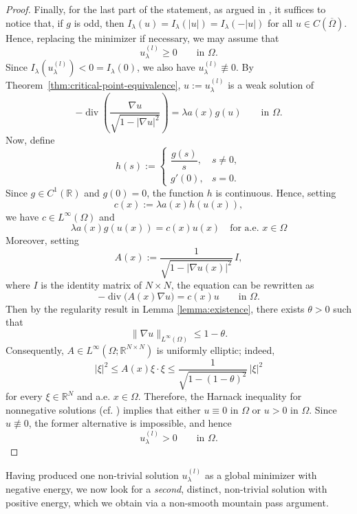 \documentclass[11pt,reqno]{amsart}
\theoremstyle{plain}
\theoremstyle{definition}
\numberwithin{equation}{section}
\begin{document}
\begin{proof}
Finally, for the last part of the statement, as argued in {\cite[Theorem 2.11]{BoCoZi26}}, it suffices to notice that, if $g$ is odd, then $I_{\lambda}(u)= I_\lambda(|u|) = I_\lambda(-|u|)$ for all $u \in C(\overline{\Omega})$. Hence, replacing the minimizer if necessary, we may assume that
$$
u_\lambda^{(l)}\geq 0 \qquad\text{in }\Omega.
$$
Since $I_\lambda(u_\lambda^{(l)})<0=I_\lambda(0)$, we also have
$u_\lambda^{(l)}\not\equiv0$. By Theorem~\ref{thm:critical-point-equivalence},
$u:=u_\lambda^{(l)}$ is a weak solution of
$$
-\operatorname{div}\left(
\frac{\nabla u}{\sqrt{1-|\nabla u|^2}}
\right)
=
\lambda a(x)g(u)
\qquad\text{in }\Omega.
$$
Now, define $$
h(s):=
\begin{cases}
\dfrac{g(s)}{s}, & s\neq 0,\\ 
g'(0), & s=0.
\end{cases}
$$
Since $g\in C^1(\mathbb R)$ and $g(0)=0$, the function $h$ is
continuous. Hence, setting
$$
c(x):=\lambda a(x)h(u(x)),
$$
we have $c\in L^\infty(\Omega)$ and
$$
\lambda a(x)g(u(x))=c(x)u(x) \quad \text{for a.e. $x\in\Omega$}
$$
Moreover, setting
$$
A(x):=
\frac{1}{\sqrt{1-|\nabla u(x)|^2}}\,I,
$$
where $I$ is the identity matrix of $N \times N$, the equation can be rewritten as
$$
-\operatorname{div}\big(A(x)\nabla u\big)=c(x)u
\qquad\text{in }\Omega.
$$
Then by the regularity result in Lemma \ref{lemma:existence}, there exists $\theta>0$ such
that
$$
\|\nabla u\|_{L^\infty(\Omega)}\leq 1-\theta.
$$
Consequently, $A\in L^\infty(\Omega;\mathbb R^{N\times N})$ is
uniformly elliptic; indeed,
$$
|\xi|^2
\leq A(x)\xi\cdot\xi
\leq
\frac{1}{\sqrt{1-(1-\theta)^2}}\,|\xi|^2
$$
for every $\xi\in\mathbb R^N$ and a.e. $x\in\Omega$. Therefore, the Harnack
inequality for nonnegative solutions (cf. {\cite[Theorem 8.20]{GT01}}) implies that either
$u\equiv0$ in $\Omega$ or $u>0$ in $\Omega$. Since $u\not\equiv0$, the former alternative is impossible, and hence
$$
u_\lambda^{(l)}>0\qquad\text{in }\Omega.
$$
\end{proof}

Having produced one non-trivial solution $u_\lambda^{(l)}$ as a global minimizer with negative energy, we now look for a \emph{second}, distinct, non-trivial solution with positive energy, which we obtain via a non-smooth mountain pass argument. 
\end{document}
